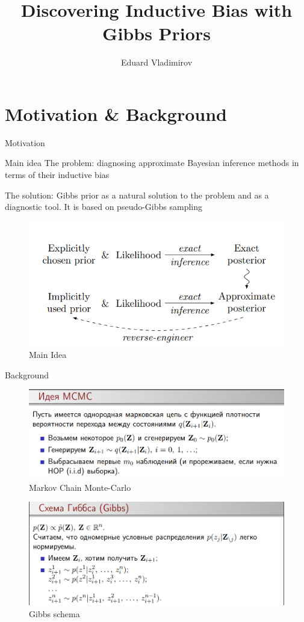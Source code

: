 \documentclass{beamer}
\title{Discovering Inductive Bias with Gibbs Priors}
\author{Eduard Vladimirov}
\institute{MIPT, 2023}
\begin{document}
	
	\begin{frame}
		\titlepage
	\end{frame}
	
	
	\begin{frame}
		\tableofcontents
	\end{frame}
	
	
	\section{Motivation \& Background}
	\begin{frame}{Motivation}
		\begin{block}{Main idea}
			The problem: diagnosing approximate Bayesian inference methods in terms
			of their inductive bias
			
			The solution: Gibbs prior as a natural solution
			to the problem and as a diagnostic tool. It is based on pseudo-Gibbs sampling
		\end{block}
	
		\begin{figure}[bhtp]
			\includegraphics[width=\linewidth]{main-idea.png}
			\caption{Main Idea}
		\end{figure}
	\end{frame}
	
	
	\begin{frame}{Background}
		\begin{figure}[bhtp]
			\includegraphics[width=0.6\linewidth]{mcmc.png}
			\caption{Markov Chain Monte-Carlo}
		\end{figure}
	
		\begin{figure}[bhtp]
			\includegraphics[width=0.6\linewidth]{gibbs-chain.png}
			\caption{Gibbs schema}
		\end{figure}
	\end{frame}
\end{document}
